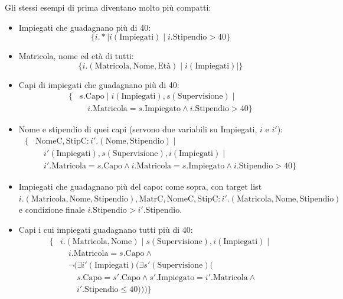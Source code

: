 \documentclass[12pt]{extarticle}
\begin{document}
\noindent Gli stessi esempi di prima diventano molto più compatti:
\begin{itemize}
    \item Impiegati che guadagnano più di 40:
    \[
    \{ i.* \mid i(\text{Impiegati}) \mid i.\text{Stipendio} > 40 \}
    \]
    \item Matricola, nome ed età di tutti:
    \[
    \{ i.(\text{Matricola}, \text{Nome}, \text{Età}) \mid i(\text{Impiegati}) \mid \}
    \]
    \item Capi di impiegati che guadagnano più di 40:
    \[
    \begin{aligned}
    \{ & s.\text{Capo} \mid i(\text{Impiegati}), s(\text{Supervisione}) \mid \\
    & \quad i.\text{Matricola} = s.\text{Impiegato} \wedge i.\text{Stipendio} > 40 \}
    \end{aligned}
    \]
    \item Nome e stipendio di quei capi (servono due variabili su Impiegati, $i$ e $i'$):
    \[
    \begin{aligned}
    \{ & \text{NomeC}, \text{StipC} : i'.(\text{Nome}, \text{Stipendio}) \mid \\
    & \quad i'(\text{Impiegati}), s(\text{Supervisione}), i(\text{Impiegati}) \mid \\
    & \quad i'.\text{Matricola} = s.\text{Capo} \wedge i.\text{Matricola} = s.\text{Impiegato} \wedge i.\text{Stipendio} > 40 \}
    \end{aligned}
    \]
    \item Impiegati che guadagnano più del capo: come sopra, con target list $i.(\text{Matricola}, \text{Nome}, \text{Stipendio}), \text{MatrC}, \text{NomeC}, \text{StipC} : i'.(\text{Matricola}, \text{Nome}, \text{Stipendio})$ e condizione finale $i.\text{Stipendio} > i'.\text{Stipendio}$.
    \item Capi i cui impiegati guadagnano tutti più di 40:
    \[
    \begin{aligned}
    \{ & i.(\text{Matricola}, \text{Nome}) \mid s(\text{Supervisione}), i(\text{Impiegati}) \mid \\
    & \quad i.\text{Matricola} = s.\text{Capo} \wedge {} \\
    & \quad \neg \big(\exists i'(\text{Impiegati}) \big(\exists s'(\text{Supervisione}) \big( \\
    & \qquad s.\text{Capo} = s'.\text{Capo} \wedge s'.\text{Impiegato} = i'.\text{Matricola} \wedge {} \\
    & \qquad i'.\text{Stipendio} \leq 40\big)\big)\big) \}
    \end{aligned}
    \]
\end{itemize}
\end{document}
